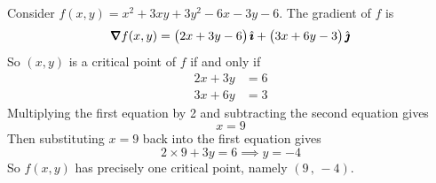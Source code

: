 \begin{eg}[$f(x,y)= x^2+3xy+3y^2-6x-3y-6$]\label{eg maxminB}
Consider $f(x,y)= x^2+3xy+3y^2-6x-3y-6$. The gradient of $f$ is
\begin{equation*}
\vnabla f(x,y) = \big(2x+3y-6\big)\,\hi +\big(3x+6y-3\big)\,\hj
\end{equation*}
So $(x,y)$ is a critical point of $f$ if and only if
\begin{align*}
2x+3y&=6\tag{E1}\\
3x+6y&=3\tag{E2}
\end{align*}
Multiplying the first equation by 2 and subtracting the second equation
gives
\begin{equation*}
x=9\tag{2(E1)\ -\ (E2)}
\end{equation*}
Then substituting $x=9$ back into the first equation gives
\begin{equation*}
2\times 9+3y=6\implies
y=-4
\end{equation*}
So $f(x,y)$ has precisely one critical point, namely $(9\,,\,-4)$.


\end{eg}

